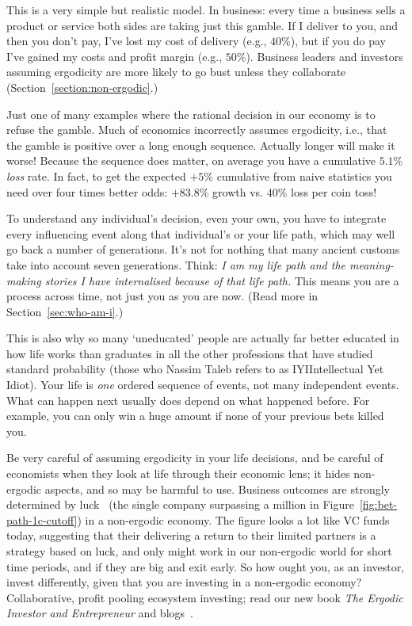 This is a very simple but realistic model. In business: every time a business sells a product or service both sides are taking just this gamble. If I deliver to you, and then you don’t pay, I’ve lost my cost of delivery (e.g., $40\%$), but if you do pay I’ve gained my costs and profit margin (e.g., $50\%$). Business leaders and investors assuming ergodicity are more likely to go bust unless they collaborate (Section~\ref{section:non-ergodic}.) 


Just one of many examples where the rational decision in our economy is to refuse the gamble. Much of economics incorrectly assumes ergodicity, i.e., that the gamble is positive over a long enough sequence. Actually longer will make it worse! Because the sequence does matter, on average you have a cumulative $5.1\%$ \emph{loss} rate. In fact, to get the expected $+5\%$ cumulative from naive statistics you need over four times better odds: $+83.8\%$ growth vs. $40\%$ loss per coin toss! 


To understand any individual's decision, even your own, you have to integrate every influencing event along that individual’s or your life path, which may well go back a number of generations. It's not for nothing that many ancient customs take into account seven generations. Think: \emph{I am my life path and the meaning-making stories I have internalised because of that life path.} This means you are a process across time, not just you as you are now. (Read more in Section~\ref{sec:who-am-i}.)


This is also why so many ‘uneducated’ people are actually far better educated in how life works than graduates in all the other professions that have studied standard probability (those who Nassim Taleb\cite{taleb-skin}  refers to as IYI\textemdash Intellectual Yet Idiot). Your life is \emph{one} ordered sequence of events, not many independent events. What can happen next usually does depend on what happened before. For example, you can only win a huge amount if none of your previous bets killed you. 


Be very careful of assuming ergodicity in your life decisions, and be careful of economists when they look at life through their economic lens; it hides non-ergodic aspects, and so may be harmful to use. Business outcomes are strongly determined by luck~\cite{ormerod-why-fail} (the single company surpassing a million in Figure~\ref{fig:bet-path-1c-cutoff}) in a non-ergodic economy. The figure looks a lot like VC funds today, suggesting that their delivering a return to their limited partners is a strategy based on luck, and only might work in our non-ergodic world for short time periods, and if they are big and exit early. So how ought you, as an investor, invest differently, given that you are investing in a non-ergodic economy? Collaborative, profit pooling ecosystem investing; read our new book \emph{The Ergodic Investor and Entrepreneur} and blogs~\cite{boyd-lines-dots}.


